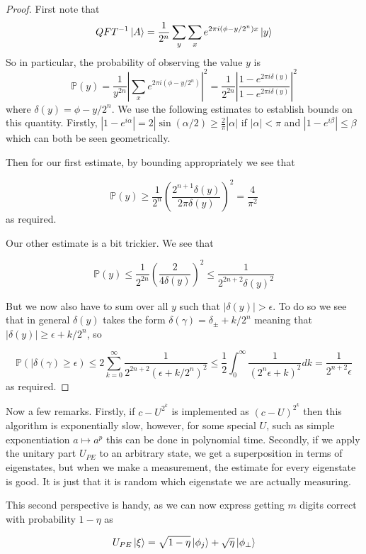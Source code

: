 \documentclass{article}
\theoremstyle{definition}
\begin{document}
\begin{proof}
  First note that
  $$ QFT^{-1} \ket{A} = \frac{1}{2^n} \sum_y \sum_x e^{2\pi i (\phi - y / 2^n)x}
  \ket{y} $$
  So in particular, the probability of observing the value $y$ is
  $$ \mathbb{P}(y) = \frac{1}{y^{2n}} \left| \sum_x e^{2 \pi i (\phi - y / 2^n)}
  \right|^2 = \frac{1}{2^{2n}} \left| \frac{1 - e^{2\pi i \delta(y)}}{1 - e^{2\pi
          i \delta(y)}} \right|^2 $$
  where $\delta(y) = \phi - y / 2^n$. We use the following estimates to
  establish bounds on this quantity. Firstly, $|1 - e^{i\alpha}| = 2|\sin(\alpha
  / 2) \geq \frac{2}{\pi} |\alpha| $ if $|\alpha| < \pi$ and $|1 - e^{i \beta}|
  \leq \beta$ which can both be seen geometrically.

  Then for our first estimate, by bounding appropriately we see that

  $$ \mathbb{P}(y) \geq \frac{1}{2^n} \left( \frac{2^{n + 1} \delta(y)}{2\pi
      \delta(y)} \right)^2 = \frac{4}{\pi^2} $$
  as required.

  Our other estimate is a bit trickier. We see that

  $$ \mathbb{P}(y) \leq \frac{1}{2^{2n}} \left( \frac{2}{4\delta(y)} \right)^2 \leq
  \frac{1}{2^{2n + 2} \delta(y)^2} $$

  But we now also have to sum over all $y$ such that $|\delta(y)| > \epsilon$.
  To do so we see that in general $\delta(y)$ takes the form $\delta(\gamma) =
  \delta_\pm + k / 2^n$ meaning that $|\delta(y)| \geq \epsilon + k / 2^n$, so

  $$ \mathbb{P}(|\delta(\gamma) \geq \epsilon) \leq 2 \sum_{k=0}^\infty
\frac{1}{2^{2n + 2} (\epsilon + k / 2^n)^2} \leq \frac{1}{2} \int_0^\infty
\frac{1}{(2^n \epsilon + k)^2} dk = \frac{1}{2^{n + 2}\epsilon} $$
as required.
\end{proof}

Now a few remarks. Firstly, if $c-U^{2^k}$ is implemented as $(c-U)^{2^k}$ then
this algorithm is exponentially slow, however, for some special $U$, such as
simple exponentiation $a \mapsto a^p$ this can be done in polynomial time.
Secondly, if we apply the unitary part $U_{PE}$ to an arbitrary state, we get a
superposition in terms of eigenstates, but when we make a measurement, the
estimate for every eigenstate is good. It is just that it is random which
eigenstate we are actually measuring.

This second perspective is handy, as we can now express getting $m$ digits
correct with probability $1 - \eta$ as

$$ U_{PE} \ket{\xi} = \sqrt{1 - \eta} \ket{\phi_j} + \sqrt{\eta} \ket{\phi_\perp} $$
\end{document}
